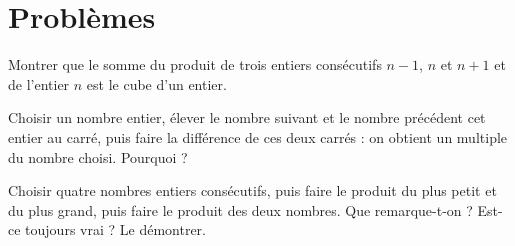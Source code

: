 \section{Probl\`emes}

%
\vspace{-1em}\begin{multicols}{3}\begin{prob}
 Montrer que le somme du produit de trois entiers cons\'ecutifs $n-1$, $n$ et $n+1$ et de l'entier $n$ est le cube d'un entier.
\end{prob}
\sautcol
\begin{prob}
 Choisir un nombre entier, \'elever le nombre suivant et le nombre pr\'ec\'edent cet entier au carr\'e, puis faire la diff\'erence de ces deux carr\'es :
on obtient un multiple du nombre choisi. Pourquoi ?
\end{prob}
\sautcol
\begin{prob}
 Choisir quatre nombres entiers cons\'ecutifs, puis faire le produit du plus petit et du plus grand, puis faire le produit des deux nombres.
Que remarque-t-on ? Est-ce toujours vrai ? Le d\'emontrer.
\end{prob}\end{multicols}\vspace{-1em}


